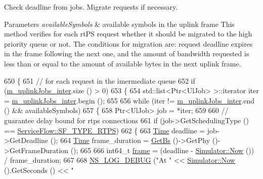 Check deadline from jobs. Migrate requests if necessary. 


\begin{DoxyParams}{Parameters}
{\em available\+Symbols} & available symbols in the uplink frame This method verifies for each rt\+PS request whether it should be migrated to the high priority queue or not. The conditions for migration are\+: request deadline expires in the frame following the next one, and the amount of bandwidth requested is less than or equal to the amount of available bytes in the next uplink frame. \\
\hline
\end{DoxyParams}

\begin{DoxyCode}
650 \{
651   \textcolor{comment}{// for each request in the imermediate queue}
652   \textcolor{keywordflow}{if} (\hyperlink{classns3_1_1UplinkSchedulerMBQoS_a70eef7c9cb6dad5e71a2105e07d1ec69}{m\_uplinkJobs\_inter}.size () > 0)
653     \{
654       std::list<Ptr<UlJob> >::iterator iter = \hyperlink{classns3_1_1UplinkSchedulerMBQoS_a70eef7c9cb6dad5e71a2105e07d1ec69}{m\_uplinkJobs\_inter}.begin ();
655 
656       \textcolor{keywordflow}{while} (iter != \hyperlink{classns3_1_1UplinkSchedulerMBQoS_a70eef7c9cb6dad5e71a2105e07d1ec69}{m\_uplinkJobs\_inter}.end () && availableSymbols)
657         \{
658           Ptr<UlJob> job = *iter;
659 
660           \textcolor{comment}{// guarantee delay bound for rtps connections}
661           \textcolor{keywordflow}{if} (job->GetSchedulingType () == \hyperlink{classns3_1_1ServiceFlow_a7990ba10be1e098328fd1e6382a26235a0e98ff713b932a029acad7e5b24bbf55}{ServiceFlow::SF\_TYPE\_RTPS})
662             \{
663               \hyperlink{namespacens3_1_1TracedValueCallback_a7ffd3e7c142ffe7c8a1d2db9b8de38ec}{Time} deadline = job->GetDeadline ();
664               \hyperlink{namespacens3_1_1TracedValueCallback_a7ffd3e7c142ffe7c8a1d2db9b8de38ec}{Time} frame\_duration = \hyperlink{classns3_1_1UplinkScheduler_afe61b7de71d92d2dff1b135744a6ff7e}{GetBs} ()->GetPhy ()->GetFrameDuration ();
665 
666               int64\_t \hyperlink{namespacevisualizer_1_1higcontainer_a3a06b62552347e51aaf4765391802719}{frame} = (deadline - \hyperlink{classns3_1_1Simulator_ac3178fa975b419f7875e7105be122800}{Simulator::Now} ()) / frame\_duration;
667 
668               \hyperlink{group__logging_ga413f1886406d49f59a6a0a89b77b4d0a}{NS\_LOG\_DEBUG} (\textcolor{stringliteral}{"At "} << \hyperlink{classns3_1_1Simulator_ac3178fa975b419f7875e7105be122800}{Simulator::Now} ().GetSeconds () << \textcolor{stringliteral}{"
}
\end{DoxyCode}
